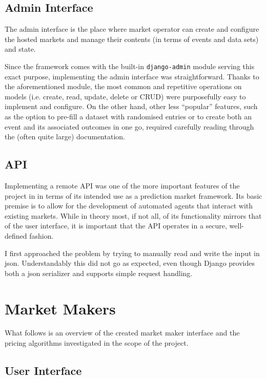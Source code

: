 \documentclass[bsc,frontabs,twoside,singlespacing,parskip,deptreport]{infthesis}     %
\begin{document}
\subsection{Admin Interface}

    The admin interface is the place where market operator can create and configure the hosted markets and manage their contents (in terms of events and data sets) and state.

    Since the framework comes with the built-in {\tt django-admin} module serving this exact purpose, implementing the admin interface was straightforward. Thanks to the aforementioned module, the most common and repetitive operations on models (i.e. create, read, update, delete or CRUD) were purposefully easy to implement and configure. On the other hand, other less ``popular'' features, such as the option to pre-fill a dataset with randomised entries or to create both an event and its associated outcomes in one go, required carefully reading through the (often quite large) documentation.   

\subsection{API}
    
    Implementing a remote API was one of the more important features of the project in in terms of its intended use as a prediction market framework. Its basic premise is to allow for the development of automated agents that interact with existing markets. While in theory most, if not all, of its functionality mirrors that of the user interface, it is important that the API operates in a secure, well-defined fashion.
    
    I first approached the problem by trying to manually read and write the input in json. Understandably this did not go as expected, even though Django provides both a json serializer and supports simple request handling. 
    
\section{Market Makers}
    What follows is an overview of the created market maker interface and the pricing algorithms investigated in the scope of the project.

\subsection{User Interface}
\end{document}
